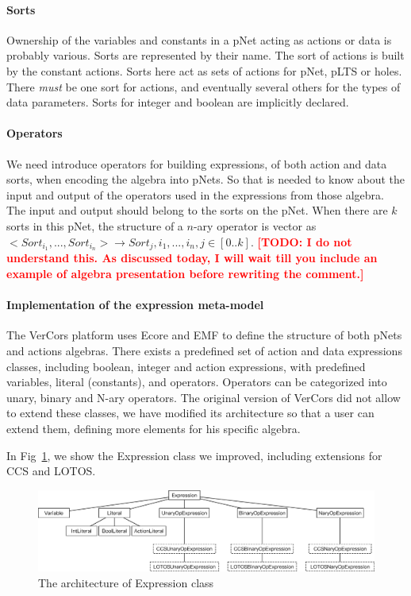 \documentclass{lncs/llncs}
\newcommand{\TODO}[1]{\textcolor{red}{\textbf{[TODO:#1]}}}
\begin{document}
\paragraph{Sorts}
Ownership of the variables and constants in a pNet acting as actions
or data is probably various. Sorts are represented by their name. The
sort of actions is built by the constant actions. Sorts here act as
sets of actions for pNet, pLTS or 
holes. There \emph{must} be one sort for actions, and eventually
several others for the types of data parameters. Sorts for integer
and boolean are implicitly declared. 

\paragraph{Operators}
We need introduce operators for building expressions, of both action
and data sorts, when encoding the 
algebra into pNets. So that is needed to know about the input and
output of the operators used in the expressions from those
algebra. The input and output should belong to the sorts on the
pNet. When there are $k$ sorts in this pNet, the structure of a
$n$-ary operator is vector as $< Sort_{i_1}, ... , Sort_{i_n} >
\rightarrow Sort_j , i_1 , ... , i_n, j \in [0..k] $.
\TODO{ I do not understand this. As discussed today, I will wait till
  you include an example of algebra presentation before rewriting the comment.}


\paragraph{Implementation of the expression meta-model}
The VerCors platform uses Ecore and EMF to define the structure of
both pNets and actions algebras. There exists a predefined set of
action and data expressions classes, including boolean, integer and
action expressions, with predefined variables, literal (constants),
and operators. Operators can be categorized into unary, binary and
N-ary operators.
The original version of VerCors did not allow to extend these classes,
we have modified its architecture so that a user can extend them,
defining more elements for his specific algebra.

In Fig~\ref{schema:expression-pnets}, we show the Expression class we
improved, including extensions for CCS and LOTOS.

\begin{figure}[t]
  \includegraphics[width=\linewidth]{XFIG/Expression}
  \caption{The architecture of Expression class}  \label{schema:expression-pnets}
\end{figure}
\end{document}
